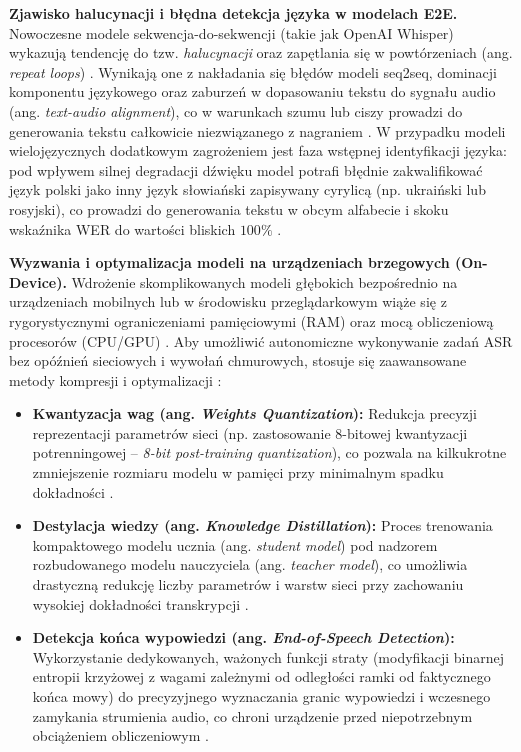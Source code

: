 \textbf{Zjawisko halucynacji i błędna detekcja języka w modelach E2E.} Nowoczesne modele sekwencja-do-sekwencji (takie jak OpenAI Whisper) wykazują tendencję do tzw. \textit{halucynacji} oraz zapętlania się w powtórzeniach (ang. \textit{repeat loops}) \cite[s.~13--14]{radford2023robust}. Wynikają one z nakładania się błędów modeli seq2seq, dominacji komponentu językowego oraz zaburzeń w dopasowaniu tekstu do sygnału audio (ang. \textit{text-audio alignment}), co w warunkach szumu lub ciszy prowadzi do generowania tekstu całkowicie niezwiązanego z nagraniem \cite[s.~13--14]{radford2023robust}. W przypadku modeli wielojęzycznych dodatkowym zagrożeniem jest faza wstępnej identyfikacji języka: pod wpływem silnej degradacji dźwięku model potrafi błędnie zakwalifikować język polski jako inny język słowiański zapisywany cyrylicą (np. ukraiński lub rosyjski), co prowadzi do generowania tekstu w obcym alfabecie i skoku wskaźnika WER do wartości bliskich $100\%$ \cite[s.~319]{pondel2024e2e}.

\textbf{Wyzwania i optymalizacja modeli na urządzeniach brzegowych (On-Device).} Wdrożenie skomplikowanych modeli głębokich bezpośrednio na urządzeniach mobilnych lub w środowisku przeglądarkowym wiąże się z rygorystycznymi ograniczeniami pamięciowymi (RAM) oraz mocą obliczeniową procesorów (CPU/GPU) \cite[s.~18]{pudo2024optimizing}. Aby umożliwić autonomiczne wykonywanie zadań ASR bez opóźnień sieciowych i wywołań chmurowych, stosuje się zaawansowane metody kompresji i optymalizacji \cite[s.~29, 36--38, 51--52]{pudo2024optimizing}:
\begin{itemize}
\item \textbf{Kwantyzacja wag (ang. \textit{Weights Quantization}):} Redukcja precyzji reprezentacji parametrów sieci (np. zastosowanie 8-bitowej kwantyzacji potrenningowej -- \textit{8-bit post-training quantization}), co pozwala na kilkukrotne zmniejszenie rozmiaru modelu w pamięci przy minimalnym spadku dokładności \cite[s.~29, 38]{pudo2024optimizing}.

\item \textbf{Destylacja wiedzy (ang. \textit{Knowledge Distillation}):} Proces trenowania kompaktowego modelu ucznia (ang. \textit{student model}) pod nadzorem rozbudowanego modelu nauczyciela (ang. \textit{teacher model}), co umożliwia drastyczną redukcję liczby parametrów i warstw sieci przy zachowaniu wysokiej dokładności transkrypcji \cite[s.~36--38]{pudo2024optimizing}.

\item \textbf{Detekcja końca wypowiedzi (ang. \textit{End-of-Speech Detection}):} Wykorzystanie dedykowanych, ważonych funkcji straty (modyfikacji binarnej entropii krzyżowej z wagami zależnymi od odległości ramki od faktycznego końca mowy) do precyzyjnego wyznaczania granic wypowiedzi i wczesnego zamykania strumienia audio, co chroni urządzenie przed niepotrzebnym obciążeniem obliczeniowym \cite[s.~51--52]{pudo2024optimizing}.
\end{itemize}

